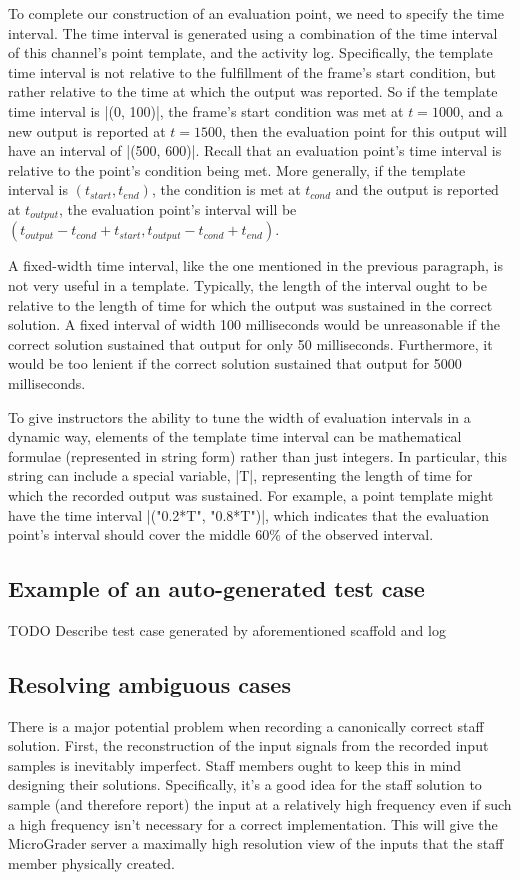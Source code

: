 \documentclass[12pt]{article}
\begin{document}
To complete our construction of an evaluation point, we need to specify the time interval.  The time interval is generated using a combination of the time interval of this channel's point template, and the activity log.  Specifically, the template time interval is not relative to the fulfillment of the frame's start condition, but rather relative to the time at which the output was reported.  So if the template time interval is |(0, 100)|, the frame's start condition was met at $t=1000$, and a new output is reported at $t=1500$, then the evaluation point for this output will have an interval of |(500, 600)|.  Recall that an evaluation point's time interval is relative to the point's condition being met.  More generally, if the template interval is $(t_{start}, t_{end})$, the condition is met at $t_{cond}$ and the output is reported at $t_{output}$, the evaluation point's interval will be $(t_{output} - t_{cond} + t_{start}, t_{output} - t_{cond} + t_{end})$.

A fixed-width time interval, like the one mentioned in the previous paragraph, is not very useful in a template.  Typically, the length of the interval ought to be relative to the length of time for which the output was sustained in the correct solution.  A fixed interval of width 100 milliseconds would be unreasonable if the correct solution sustained that output for only 50 milliseconds.  Furthermore, it would be too lenient if the correct solution sustained that output for 5000 milliseconds.

To give instructors the ability to tune the width of evaluation intervals in a dynamic way, elements of the template time interval can be mathematical formulae (represented in string form) rather than just integers.  In particular, this string can include a special variable, |T|, representing the length of time for which the recorded output was sustained.  For example, a point template might have the time interval |("0.2*T", "0.8*T")|, which indicates that the evaluation point's interval should cover the middle 60\% of the observed interval. 

\subsection{Example of an auto-generated test case}
TODO Describe test case generated by aforementioned scaffold and log

\subsection{Resolving ambiguous cases}
There is a major potential problem when recording a canonically correct staff solution.  First, the reconstruction of the input signals from the recorded input samples is inevitably imperfect.  Staff members ought to keep this in mind designing their solutions.  Specifically, it's a good idea for the staff solution to sample (and therefore report) the input at a relatively high frequency even if such a high frequency isn't necessary for a correct implementation.  This will give the MicroGrader server a maximally high resolution view of the inputs that the staff member physically created.
\end{document}
